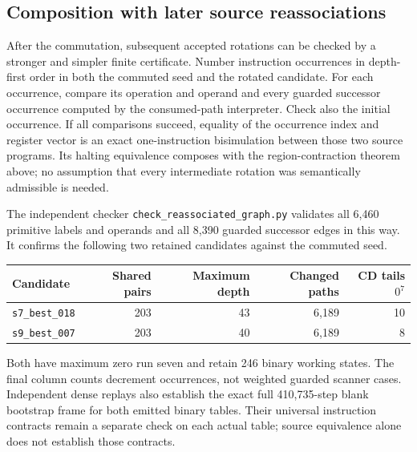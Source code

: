 \subsection{Composition with later source reassociations}

After the commutation, subsequent accepted rotations can be checked by a
stronger and simpler finite certificate.  Number instruction occurrences
in depth-first order in both the commuted seed and the rotated candidate.
For each occurrence, compare its operation and operand and every guarded
successor occurrence computed by the consumed-path interpreter.  Check
also the initial occurrence.  If all comparisons succeed, equality of the
occurrence index and register vector is an exact one-instruction
bisimulation between those two source programs.  Its halting equivalence
composes with the region-contraction theorem above; no assumption that
every intermediate rotation was semantically admissible is needed.

The independent checker \texttt{check\_reassociated\_graph.py} validates
all 6,460 primitive labels and operands and all 8,390 guarded successor
edges in this way.  It confirms the following two retained candidates
against the commuted seed.
\begin{center}
\begin{tabular}{lrrrr}
\hline
Candidate & Shared pairs & Maximum depth & Changed paths & CD tails $0^7$\\
\hline
\texttt{s7\_best\_018} & 203 & 43 & 6,189 & 10\\
\texttt{s9\_best\_007} & 203 & 40 & 6,189 & 8\\
\hline
\end{tabular}
\end{center}
Both have maximum zero run seven and retain 246 binary working states.
The final column counts decrement occurrences, not weighted guarded
scanner cases.  Independent dense replays also establish the exact full
410,735-step blank bootstrap frame for both emitted binary tables.
Their universal instruction contracts remain a separate check on each
actual table; source equivalence alone does not establish those contracts.
